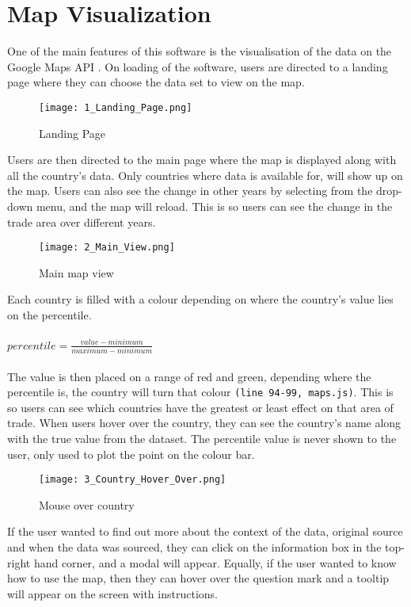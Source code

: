 \section{Map Visualization}
One of the main features of this software is the visualisation of the data on the Google Maps API \cite{googleapi1}. On loading of the software, users are directed to a landing page where they can choose the data set to view on the map. 

\begin{figure}[!h]
\centering
\texttt{[image: 1\_Landing\_Page.png]}
\caption{Landing Page}
\label{fig:x Landing Page}
\end{figure}

Users are then directed to the main page where the map is displayed along with all the country's data. Only countries where data is available for, will show up on the map. Users can also see the change in other years by selecting from the drop-down menu, and the map will reload. This is so users can see the change in the trade area over different years.

\begin{figure}[!h]
\centering
\texttt{[image: 2\_Main\_View.png]}
\caption{Main map view}
\label{fig:x Main map view}
\end{figure}

Each country is filled with a colour depending on where the country's value lies on the percentile.\\
\\
$percentile = \frac{value - minimum}{maximum - minimum}$\\
\\
The value is then placed on a range of red and green, depending where the percentile is, the country will turn that colour \texttt{(line 94-99, maps.js)}. This is so users can see which countries have the greatest or least effect on that area of trade. 
\newpage
When users hover over the country, they can see the country's name along with the true value from the dataset. The percentile value is never shown to the user, only used to plot the point on the colour bar.

\begin{figure}[!h]
\centering
\texttt{[image: 3\_Country\_Hover\_Over.png]}
\caption{Mouse over country}
\label{fig:x Mouse over country}
\end{figure}
\newpage
If the user wanted to find out more about the context of the data, original source and when the data was sourced, they can click on the information box in the top-right hand corner, and a modal will appear. Equally, if the user wanted to know how to use the map, then they can hover over the question mark and a tooltip \cite{tooltip} will appear on the screen with instructions.


